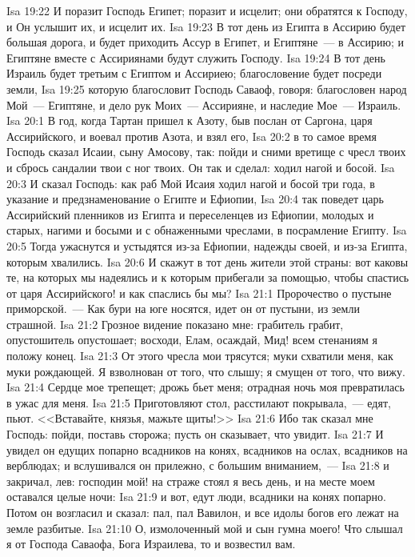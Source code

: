 \vs Isa 19:22 И поразит Господь Египет; поразит и исцелит; они обратятся к Господу, и Он услышит их, и исцелит их.
\vs Isa 19:23 В тот день из Египта в Ассирию будет большая дорога, и будет приходить Ассур в Египет, и Египтяне~--- в Ассирию; и Египтяне вместе с Ассириянами будут служить Господу.
\vs Isa 19:24 В тот день Израиль будет третьим с Египтом и Ассириею; благословение будет посреди земли,
\vs Isa 19:25 которую благословит Господь Саваоф, говоря: благословен народ Мой~--- Египтяне, и дело рук Моих~--- Ассирияне, и наследие Мое~--- Израиль.
\vs Isa 20:1 В год, когда Тартан пришел к Азоту, быв послан от Саргона, царя Ассирийского, и воевал против Азота, и взял его,
\vs Isa 20:2 в то самое время Господь сказал Исаии, сыну Амосову, так: пойди и сними вретище с чресл твоих и сбрось сандалии твои с ног твоих. Он так и сделал: ходил нагой и босой.
\vs Isa 20:3 И сказал Господь: как раб Мой Исаия ходил нагой и босой три года, в указание и предзнаменование о Египте и Ефиопии,
\vs Isa 20:4 так поведет царь Ассирийский пленников из Египта и переселенцев из Ефиопии, молодых и старых, нагими и босыми и с обнаженными чреслами, в посрамление Египту.
\vs Isa 20:5 Тогда ужаснутся и устыдятся из-за Ефиопии, надежды своей, и из-за Египта, которым хвалились.
\vs Isa 20:6 И скажут в тот день жители этой страны: вот каковы те, на которых мы надеялись и к которым прибегали за помощью, чтобы спастись от царя Ассирийского! и как спаслись бы мы?
\vs Isa 21:1 Пророчество о пустыне приморской.~--- Как бури на юге носятся, идет он от пустыни, из земли страшной.
\vs Isa 21:2 Грозное видение показано мне: грабитель грабит, опустошитель опустошает; восходи, Елам, осаждай, Мид! всем стенаниям я положу конец.
\vs Isa 21:3 От этого чресла мои трясутся; муки схватили меня, как муки рождающей. Я взволнован от того, что слышу; я смущен от того, что вижу.
\vs Isa 21:4 Сердце мое трепещет; дрожь бьет меня; отрадная ночь моя превратилась в ужас для меня.
\vs Isa 21:5 Приготовляют стол, расстилают покрывала,~--- едят, пьют. <<Вставайте, князья, мажьте щиты!>>
\vs Isa 21:6 Ибо так сказал мне Господь: пойди, поставь сторожа; пусть он сказывает, что увидит.
\vs Isa 21:7 И увидел он едущих попарно всадников на конях, всадников на ослах, всадников на верблюдах; и вслушивался он прилежно, с большим вниманием,~---
\vs Isa 21:8 и закричал,  лев: господин мой! на страже стоял я весь день, и на месте моем оставался целые ночи:
\vs Isa 21:9 и вот, едут люди, всадники на конях попарно. Потом он возгласил и сказал: пал, пал Вавилон, и все идолы богов его лежат на земле разбитые.
\vs Isa 21:10 О, измолоченный мой и сын гумна моего! Что слышал я от Господа Саваофа, Бога Израилева, то и возвестил вам.
